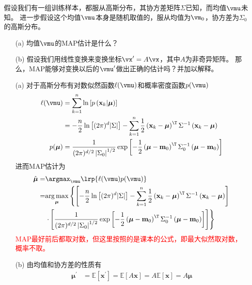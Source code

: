 \documentclass[reportComp]{thesis}
\begin{document}
\begin{question}[\textsection 3 Q19]
假设我们有一组训练样本，都服从高斯分布，其协方差矩阵$\Sigma$已知，而均值$\vmu$未知。
进一步假设这个均值$\vmu$本身是随机取值的，服从均值为$\vm_0$，协方差为$\Sigma_0$的高斯分布。
\begin{itemize}
	\item [(a)] 均值$\vmu$的MAP估计是什么？
	\item [(b)] 假设我们用线性变换来变换坐标$\vx'=A\vx$，其中$A$为非奇异矩阵。
	那么，MAP能够对变换以后的$\vmu'$做出正确的估计吗？并加以解释。
\end{itemize}
\end{question}
\begin{answer}
\begin{itemize}
	\item [(a)] 对于高斯分布有对数似然函数$\ell(\vmu)$和概率密度函数$p(\vmu)$
	\[\begin{aligned}
	\ell(\vmu)
	&=\sum_{k=1}^{n} \ln \left[p\left(\mathbf{x}_{k} | \boldsymbol{\mu}\right)\right] \\
	&=-\frac{n}{2} \ln \left[(2 \pi)^{d}|\Sigma|\right]-\sum_{k=1}^{n} \frac{1}{2}\left(\mathbf{x}_{k}-\boldsymbol{\mu}\right)^{\T} \Sigma^{-1}\left(\mathbf{x}_{k}-\boldsymbol{\mu}\right)\\
	p(\boldsymbol{\mu})&=\frac{1}{(2 \pi)^{d / 2}\left|\Sigma_{0}\right|^{1 / 2}} \exp \left[-\frac{1}{2}\left(\boldsymbol{\mu}-\mathbf{m}_{0}\right)^{\T} \Sigma_{0}^{-1}\left(\boldsymbol{\mu}-\mathbf{m}_{0}\right)\right]
	\end{aligned}\]
	进而MAP估计为
	\[\begin{aligned} \hat{\boldsymbol{\mu}}
	=&\argmax_{\vmu}\lrp{\ell(\vmu)p(\vmu)}\\
	=& \underset{\boldsymbol{\mu}}{\arg \max }\left\{\left[-\frac{n}{2} \ln \left[(2 \pi)^{d}|\Sigma|\right]-\sum_{k=1}^{n} \frac{1}{2}\left(\mathbf{x}_{k}-\boldsymbol{\mu}\right)^{\T} \Sigma^{-1}\left(\mathbf{x}_{k}-\boldsymbol{\mu}\right)\right]\right.\\
	&\left. \cdot\left[\frac{1}{(2 \pi)^{d / 2}\left|\Sigma_{0}\right|^{1 / 2}} \exp \left[-\frac{1}{2}\left(\boldsymbol{\mu}-\mathbf{m}_{0}\right)^{\T} \Sigma_{0}^{-1}\left(\boldsymbol{\mu}-\mathbf{m}_{0}\right)\right]\right]\right\}
	\end{aligned}\]
	\textcolor{red}{MAP最好前后都取对数，但这里按照的是课本的公式，即最大似然取对数，概率不取。}
	\item [(b)] 由均值和协方差的性质有
	\[\begin{aligned}\boldsymbol{\mu}^{\prime}&= \mathbb{E}\left[\mathbf{x}^{\prime}\right]=\mathbb{E}[A \mathbf{x}]=A \mathbb{E}[\mathbf{x}]=A \boldsymbol{\mu}\\

\end{aligned}\]
\end{itemize}
\end{answer}
\end{document}
